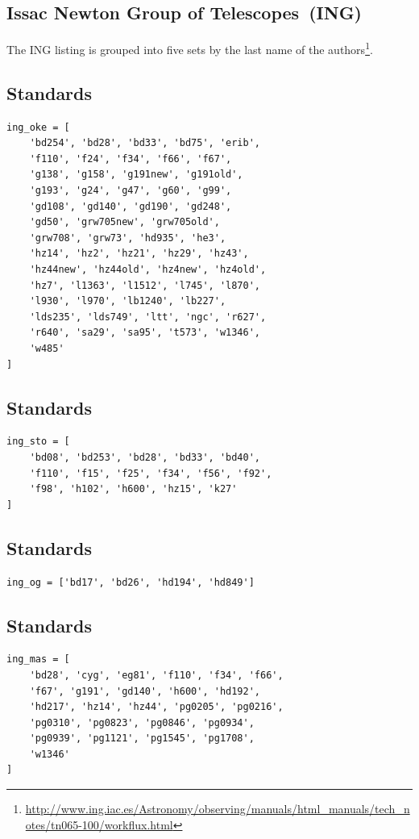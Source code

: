 \documentclass[fleqn,usenatbib]{mnras}
\begin{document}
\subsection{Issac Newton Group of Telescopes~(ING)}

The ING listing is grouped into five sets by the last name of the authors\footnote{\url{http://www.ing.iac.es/Astronomy/observing/manuals/html_manuals/tech_notes/tn065-100/workflux.html}}.
\subsection*{\citet{1990AJ.....99.1621O} Standards}
\begin{verbatim}
ing_oke = [
    'bd254', 'bd28', 'bd33', 'bd75', 'erib',
    'f110', 'f24', 'f34', 'f66', 'f67',
    'g138', 'g158', 'g191new', 'g191old',
    'g193', 'g24', 'g47', 'g60', 'g99',
    'gd108', 'gd140', 'gd190', 'gd248',
    'gd50', 'grw705new', 'grw705old',
    'grw708', 'grw73', 'hd935', 'he3',
    'hz14', 'hz2', 'hz21', 'hz29', 'hz43',
    'hz44new', 'hz44old', 'hz4new', 'hz4old',
    'hz7', 'l1363', 'l1512', 'l745', 'l870',
    'l930', 'l970', 'lb1240', 'lb227',
    'lds235', 'lds749', 'ltt', 'ngc', 'r627',
    'r640', 'sa29', 'sa95', 't573', 'w1346',
    'w485'
]
\end{verbatim}

\subsection*{\citet{1977ApJ...218..767S} Standards}

\begin{verbatim}
ing_sto = [
    'bd08', 'bd253', 'bd28', 'bd33', 'bd40',
    'f110', 'f15', 'f25', 'f34', 'f56', 'f92',
    'f98', 'h102', 'h600', 'hz15', 'k27'
]
\end{verbatim}


\subsection*{\citet{1965ApJ...141...83E} Standards}
\begin{verbatim}
ing_og = ['bd17', 'bd26', 'hd194', 'hd849']
\end{verbatim}

\subsection*{\citet{1988ApJ...328..315M} Standards}
\begin{verbatim}
ing_mas = [
    'bd28', 'cyg', 'eg81', 'f110', 'f34', 'f66',
    'f67', 'g191', 'gd140', 'h600', 'hd192',
    'hd217', 'hz14', 'hz44', 'pg0205', 'pg0216',
    'pg0310', 'pg0823', 'pg0846', 'pg0934',
    'pg0939', 'pg1121', 'pg1545', 'pg1708',
    'w1346'
]
\end{verbatim}
\end{document}
